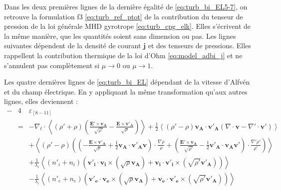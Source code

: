 Dans les deux premières lignes de la dernière égalité de \eqref{eq:turb_bi_EL5-7}, on retrouve la formulation f3 \eqref{eq:turb_ref_ptot} de la  contribution du tenseur de pression de la loi générale \ac{MHD} gyrotrope \eqref{eq:turb_cpg_elk}. Elles s'écrivent de la même manière, que les quantités soient sans dimension ou pas. Les lignes suivantes dépendent de la densité de courant $\boldsymbol{j}$ et des tenseurs de pressions. Elles rappellent la contribution thermique de la loi d'Ohm \eqref{eq:model_adbi_j} et ne s'annulent pas complètement si $\mu \rightarrow 0$ ou $\mu \rightarrow 1$. 

Les quatre dernières lignes de \eqref{eq:turb_bi_EL} dépendant de la vitesse d'Alfvén et du champ électrique. En y appliquant la même transformation qu'aux autres lignes, elles deviennent : 
\begin{eqnarray}%
  - &4&  \varepsilon_{[8-11]} \nonumber \\
   &=& - \nabla_{\boldsymbol{\ell}} \cdot \left< \left(\rho' + \rho\right) \left(\frac{ \boldsymbol{E'}\times \boldsymbol{v_A} }{\sqrt{\rho'}} - \frac{ \boldsymbol{E}\times \boldsymbol{v'_A} }{\sqrt{\rho}}\right)\right> +  \frac{1}{2}\left<\left(\rho' - \rho\right) \boldsymbol{v_A} \cdot \boldsymbol{v'_{A}} \left(  \nabla \cdot \boldsymbol{v}-  \nabla' \cdot \boldsymbol{v'}\right)\right> \nonumber\\ %
  &&+ \left<\left(\rho' - \rho\right) \left(\left(-\frac{ \boldsymbol{E}\times \boldsymbol{v'_A} }{\sqrt{\rho}} + \frac{1}{2}\boldsymbol{v_A} \cdot \boldsymbol{v'_{A}} \boldsymbol{v}\right) \cdot \frac{\nabla  \rho }{\rho}+\left(\frac{ \boldsymbol{E'}\times \boldsymbol{v_A} }{\sqrt{\rho'}} - \frac{1}{2}\boldsymbol{v'_A} \cdot \boldsymbol{v_{A}} \boldsymbol{v'}\right) \cdot \frac{\nabla'  \rho' }{\rho'}\right)\right> \nonumber\\ %
  &&+ \frac{1}{\lambda_i} \left<\left(n'_i + n_i\right)\left(  \boldsymbol{v'_i} \cdot \boldsymbol{v_i} \times \left(\sqrt{\rho}\boldsymbol{v_A}\right) +  \boldsymbol{v_i} \cdot \boldsymbol{v'_i} \times \left( \sqrt{\rho'}\boldsymbol{v'_A}\right)\right) \right> \nonumber\\ %
  &&- \frac{1}{\lambda_i} \left<\left(n'_e + n_e\right)\left(  \boldsymbol{v'_e} \cdot \boldsymbol{v_e} \times \left(\sqrt{\rho}\boldsymbol{v_A}\right) +  \boldsymbol{v_e} \cdot \boldsymbol{v'_e} \times \left( \sqrt{\rho'}\boldsymbol{v'_A}\right)\right)\right> \nonumber\\

\end{eqnarray}
